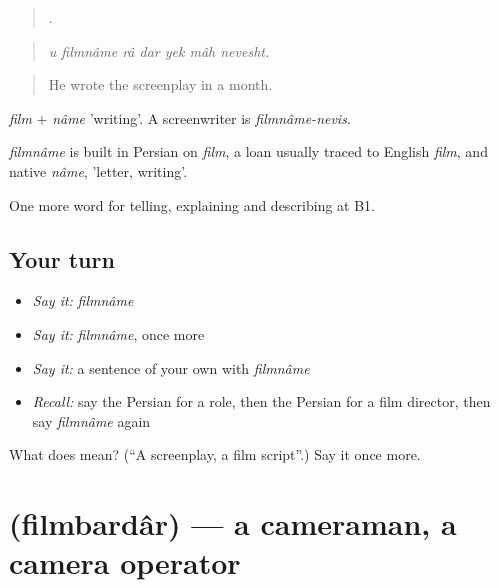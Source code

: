 \begin{quote}
      .
\end{quote}

\begin{quote}
\emph{u filmnâme râ dar yek mâh nevesht.}
\end{quote}

\begin{quote}
He wrote the screenplay in a month.
\end{quote}

\emph{film} + \emph{nâme} 'writing'. A screenwriter is \emph{filmnâme-nevis}.

\begin{cousinweb}
\emph{filmnâme} is built in Persian on \emph{film}, a loan usually traced to English \emph{film}, and native \emph{nâme}, 'letter, writing'.
\end{cousinweb}

\begin{grammarlens}[title={What you've built}]
One more word for telling, explaining and describing at B1.
\end{grammarlens}

\subsection*{Your turn}
\begin{itemize}
\raggedright
  \item \emph{Say it:} \emph{filmnâme}
  \item \emph{Say it:} \emph{filmnâme}, once more
  \item \emph{Say it:} a sentence of your own with \emph{filmnâme}
  \item \emph{Recall:} say the Persian for a role, then the Persian for a film director, then say \emph{filmnâme} again
\end{itemize}

\begin{tcolorbox}[breakable,colback=teal!4,colframe=teal!35!black,title={Before you move on}]
What does  mean? (\textquotedblleft{}A screenplay, a film script\textquotedblright{}.) Say it once more.
\end{tcolorbox}
\section[\texorpdfstring{\fa{فیلمبردار} (filmbardâr)}{فیلمبردار (filmbardâr)}]{ (filmbardâr) — a cameraman, a camera operator}

